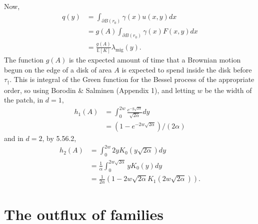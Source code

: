 \documentclass{article}
\newcommand{\E}{\mathbb{E}}
\newcommand{\one}{\mathbf{1}}
\newcommand{\migrate}{\lambda_\text{mig}}
\begin{document}
Now, 
\begin{align}
    q(y)  &= \int_{\partial B(r_0)} \gamma(x) u(x,y) dx  \\
          &= g(A) \int_{\partial B(r_0)} \gamma(x) F(x,y) dx \\
          &= \frac{ g(A) }{ \E[K] } \migrate(y) .
\end{align}
The function $g(A)$ is the expected amount of time that a Brownian motion begun on the edge of a disk of area $A$
is expected to spend inside the disk before $\tau_\dagger$.
This is integral of the Green function for the Bessel process of the appropriate order, 
so using Borodin \& Salminen (Appendix 1),
and letting $w$ be the width of the patch,
in $d=1$,
\begin{align}
    h_1(A) %
  &= \int_0^{2w} \frac{ e^{- y \sqrt{2\alpha} }}{\sqrt{2\alpha}} dy \\
  &= (1-e^{-2w\sqrt{2\alpha}})/(2\alpha)
\end{align}
and in $d=2$, by \citet{gradshteyn2007table} 5.56.2,
\begin{align}
    h_2(A) %
  &= \int_0^{2w} 2 y K_0(y \sqrt{2\alpha}) dy \\
  &= \frac{1}{\alpha}\int_0^{2w\sqrt{2\alpha}} y K_0(y) dy \\
  &= \frac{1}{2\alpha}\left(1- 2w\sqrt{2\alpha} K_1(2w\sqrt{2\alpha}) \right)  .
\end{align}


\section{The outflux of families}
\label{apx:outflux}
\end{document}
